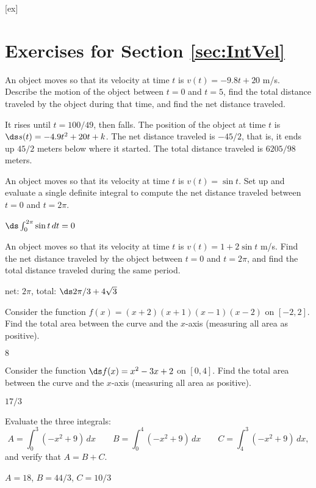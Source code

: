 [ex]
\section*{Exercises for Section \ref{sec:IntVel}}

\begin{enumialphparenastyle}

\begin{ex}
 An object moves so that its velocity at time $t$ is
$v(t)=-9.8t+20$ m/s. Describe the motion of the object between $t=0$ and
$t=5$, find the total distance traveled by the object during that
time, and find the net distance traveled.
\begin{sol}
 It rises until $t=100/49$, then falls. The position of the
object at time $t$ is $\ds s(t)=-4.9t^2+20t+k$. The net distance traveled
is $-45/2$, that is, it ends up $45/2$ meters below where it started.
The total distance traveled is $6205/98$ meters. 
\end{sol}
\end{ex}

\begin{ex}
 An object moves so that its velocity at time $t$ is $v(t)=\sin t$.
Set up and evaluate a single definite integral to compute the
net distance traveled between $t=0$ and $t=2\pi$.
\begin{sol}
 $\ds\int_0^{2\pi}\sin t\,dt=0$
\end{sol}
\end{ex}

\begin{ex}
 An object moves so that its velocity at time $t$ is
$v(t)=1+2\sin t$ m/s. Find the net distance traveled by the object
between $t=0$ and $t=2\pi$, and find the total distance traveled
during the same period.
\begin{sol}
 net: $2\pi$, total: $\ds 2\pi/3+4\sqrt3$ 
\end{sol}
\end{ex}

\begin{ex}
 Consider the function $f(x)=(x+2)(x+1)(x-1)(x-2)$ on
$[-2,2]$. Find the total area between the curve and the $x$-axis
(measuring all area as positive).
\begin{sol}
 $8$
\end{sol}
\end{ex}

\begin{ex}
 Consider the function $\ds f(x)=x^2-3x+2$ on
$[0,4]$. Find the total area between the curve and the $x$-axis
(measuring all area as positive).
\begin{sol}
 $17/3$
\end{sol}
\end{ex}

\begin{ex}
 Evaluate the three integrals:
$$
  A=\int_0^3 (-x^2+9)\,dx\qquad B=\int_0^{4} (-x^2+9)\,dx\qquad 
  C=\int_{4}^3 (-x^2+9)\,dx,
$$
and verify that $A=B+C$.
\begin{sol}
 $A=18$, $B=44/3$, $C=10/3$
\end{sol}
\end{ex}

\end{enumialphparenastyle}